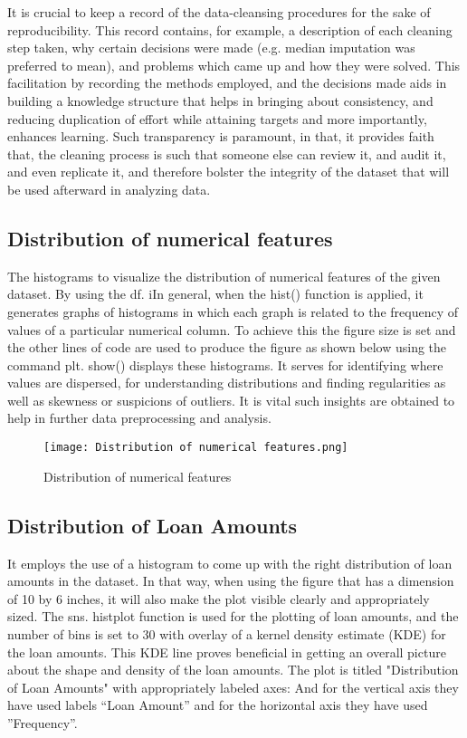 \documentclass[12pt, a4paper,oneside]{book}
\numberwithin{equation}{section}
\begin{document}
It is crucial to keep a record of the data-cleansing procedures for the sake of reproducibility. This record contains, for example, a description of each cleaning step taken, why certain decisions were made (e.g. median imputation was preferred to mean), and problems which came up and how they were solved. This facilitation by recording the methods employed, and the decisions made aids in building a knowledge structure that helps in bringing about consistency, and reducing duplication of effort while attaining targets and more importantly, enhances learning. Such transparency is paramount, in that, it provides faith that, the cleaning process is such that someone else can review it, and audit it, and even replicate it, and therefore bolster the integrity of the dataset that will be used afterward in analyzing data.


\subsection{Distribution of numerical features}

The histograms to visualize the distribution of numerical features of the given dataset. By using the df. iIn general, when the hist() function is applied, it generates graphs of histograms in which each graph is related to the frequency of values of a particular numerical column. To achieve this the figure size is set and the other lines of code are used to produce the figure as shown below using the command plt. show() displays these histograms. It serves for identifying where values are dispersed, for understanding distributions and finding regularities as well as skewness or suspicions of outliers. It is vital such insights are obtained to help in further data preprocessing and analysis. 

 \begin{figure}[ht]
    \centering
    \texttt{[image: Distribution of numerical features.png]}
    \caption{Distribution of numerical features}
    \label{fig:subsubsection}
\end{figure}
\FloatBarrier


\subsection{Distribution of Loan Amounts}

It employs the use of a histogram to come up with the right distribution of loan amounts in the dataset. In that way, when using the figure that has a dimension of 10 by 6 inches, it will also make the plot visible clearly and appropriately sized. The sns. histplot function is used for the plotting of loan amounts, and the number of bins is set to 30 with overlay of a kernel density estimate (KDE) for the loan amounts. This KDE line proves beneficial in getting an overall picture about the shape and density of the loan amounts. The plot is titled "Distribution of Loan Amounts" with appropriately labeled axes: And for the vertical axis they have used labels “Loan Amount” and for the horizontal axis they have used ”Frequency”. 
\end{document}
